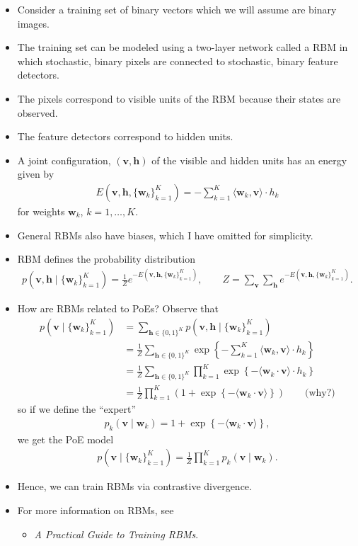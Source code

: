\documentclass[10pt]{article}
\begin{document}
\begin{itemize}
\item Consider a training set of binary vectors which we will assume are binary images.
\item The training set can be modeled using a two-layer network called a RBM in which stochastic, binary pixels are connected to stochastic, binary feature detectors.
\item The pixels correspond to visible units of the RBM because their states are observed.
\item The feature detectors correspond to hidden units.
\item A joint configuration, $(\mathbf{v},\mathbf{h})$ of the visible and hidden units has an energy given by
\begin{align*}
E(\mathbf{v},\mathbf{h}, \{\mathbf{w}_k\}_{k = 1}^K) = -\sum_{k = 1}^K \langle \mathbf{w}_k, \mathbf{v} \rangle \cdot h_k
\end{align*}
for weights $\mathbf{w}_k$, $k = 1, \ldots, K$.
\item General RBMs also have biases, which I have omitted for simplicity.
\item RBM defines the probability distribution
\begin{align*}
p(\mathbf{v},\mathbf{h} \mid \{\mathbf{w}_k\}_{k = 1}^K) = \frac{1}{Z} e^{-E(\mathbf{v},\mathbf{h}, \{\mathbf{w}_k\}_{k = 1}^K)}, \qquad Z = \sum_\mathbf{v} \sum_\mathbf{h} e^{-E(\mathbf{v},\mathbf{h},\{\mathbf{w}_k\}_{k = 1}^K)}.
\end{align*}
\item How are RBMs related to PoEs? Observe that
\begin{align*}
p(\mathbf{v} \mid \{\mathbf{w}_k\}_{k = 1}^K) &= \sum_{\mathbf{h} \in \{0, 1\}^K} p(\mathbf{v}, \mathbf{h} \mid \{\mathbf{w}_k\}_{k = 1}^K) \\
&= \frac{1}{Z} \sum_{\mathbf{h} \in \{0, 1\}^K} \exp\left\{ -\sum_{k = 1}^K \langle \mathbf{w}_k, \mathbf{v} \rangle \cdot h_k \right\} \\
&= \frac{1}{Z} \sum_{\mathbf{h} \in \{0, 1\}^K} \prod_{k = 1}^K \exp\left\{ - \langle \mathbf{w}_k \cdot \mathbf{v} \rangle \cdot h_k \right\} \\
&= \frac{1}{Z} \prod_{k = 1}^K (1 + \exp\left\{ - \langle \mathbf{w}_k \cdot \mathbf{v} \rangle \right\}) \qquad \text{(why?)}
\end{align*}
so if we define the \enquote{expert}
\begin{align*}
p_k(\mathbf{v} \mid \mathbf{w}_k) = 1 + \exp\left\{ - \langle \mathbf{w}_k \cdot \mathbf{v} \rangle \right\},
\end{align*}
we get the PoE model
\begin{align*}
p(\mathbf{v} \mid \{\mathbf{w}_k\}_{k = 1}^K) = \frac{1}{Z} \prod_{k = 1}^K p_k(\mathbf{v} \mid \mathbf{w}_k).
\end{align*}
\item Hence, we can train RBMs via contrastive divergence.
\item For more information on RBMs, see
\begin{itemize}
\item \textit{A Practical Guide to Training RBMs}.
\end{itemize}
\end{itemize}
\end{document}
